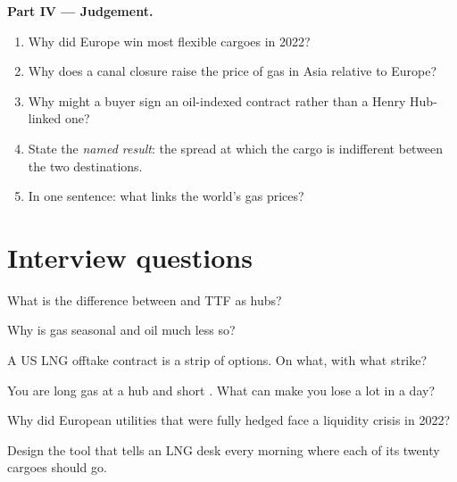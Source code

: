\begin{problem}
\medskip\noindent\textbf{Part IV --- Judgement.}
\begin{enumerate}[resume]
\item Why did Europe win most flexible cargoes in 2022?
\item Why does a canal closure raise the price of gas in Asia relative to Europe?
\item Why might a buyer sign an oil-indexed contract rather than a Henry Hub-linked one?
\item State the \emph{named result}: the spread at which the cargo is indifferent between
the two destinations.
\item In one sentence: what links the world's gas prices?
\end{enumerate}
\end{problem}

\section{Interview questions}

\begin{interviewq}\label{iq:m3:natural-gas-and-lng:1}
What is the difference between  and TTF as hubs?
\end{interviewq}

\begin{interviewq}\label{iq:m3:natural-gas-and-lng:2}
Why is gas seasonal and oil much less so?
\end{interviewq}

\begin{interviewq}\label{iq:m3:natural-gas-and-lng:3}
A US LNG offtake contract is a strip of options. On what, with what strike?
\end{interviewq}

\begin{interviewq}\label{iq:m3:natural-gas-and-lng:4}
You are long gas at a hub and short . What can make you lose a lot in a day?
\end{interviewq}

\begin{interviewq}\label{iq:m3:natural-gas-and-lng:5}
Why did European utilities that were fully hedged face a liquidity crisis in 2022?
\end{interviewq}

\begin{interviewq}\label{iq:m3:natural-gas-and-lng:6}
Design the tool that tells an LNG desk every morning where each of its twenty cargoes
should go.
\end{interviewq}
